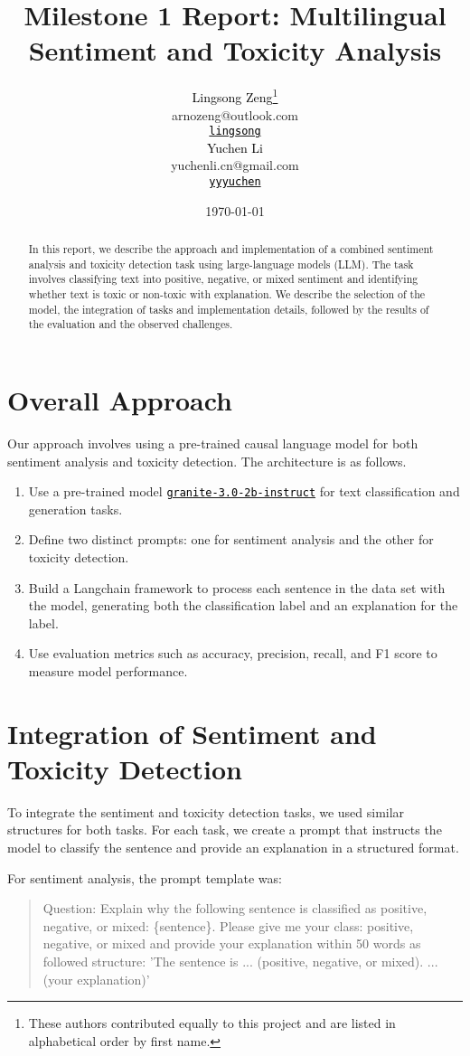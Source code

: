\documentclass[11pt]{article}
\title{Milestone 1 Report: Multilingual Sentiment and Toxicity Analysis}
\author{
    \textcolor{black}{Lingsong Zeng}\thanks{These authors contributed equally to this project and are listed in alphabetical order by first name.} \\ 
    arnozeng@outlook.com \\
      \texttt{\href{https://github.ubc.ca/lingsong}{\textcolor{black}{\faGithub \space lingsong}}}
 \\\And
    \textcolor{black}{Yuchen Li}\footnotemark[1] \\ 
    yuchenli.cn@gmail.com \\ 
  \texttt{\href{https://github.ubc.ca/yyyuchen}{\textcolor{black}{\faGithub \space yyyuchen}}}
}
\date{\today} %
\begin{document}
\maketitle
\begin{abstract}
  In this report, we describe the approach and implementation of a combined sentiment analysis and toxicity detection task using large-language models (LLM). The task involves classifying text into positive, negative, or mixed sentiment and identifying whether text is toxic or non-toxic with explanation. We describe the selection of the model, the integration of tasks and implementation details, followed by the results of the evaluation and the observed challenges.
\end{abstract}

\section{Overall Approach}
Our approach involves using a pre-trained causal language model for both sentiment analysis and toxicity detection. The architecture is as follows.
\begin{enumerate}
  \item Use a pre-trained model \texttt{\href{https://huggingface.co/ibm-granite/granite-3.0-2b-instruct}{\textcolor{black}{granite-3.0-2b-instruct}}} for text classification and generation tasks.
  \item Define two distinct prompts: one for sentiment analysis and the other for toxicity detection.
  \item Build a Langchain framework to process each sentence in the data set with the model, generating both the classification label and an explanation for the label.
  \item Use evaluation metrics such as accuracy, precision, recall, and F1 score to measure model performance.
\end{enumerate}

\section{Integration of Sentiment and Toxicity Detection}
To integrate the sentiment and toxicity detection tasks, we used similar structures for both tasks. For each task, we create a prompt that instructs the model to classify the sentence and provide an explanation in a structured format.

For sentiment analysis, the prompt template was: 
\begin{quote}
Question: Explain why the following sentence is classified as positive, negative, or mixed: \{sentence\}. Please give me your class: positive, negative, or mixed and provide your explanation within 50 words as followed structure: 'The sentence is ... (positive, negative, or mixed). ... (your explanation)'
\end{quote}
\end{document}
